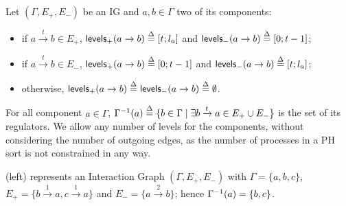\begin{definition}\label{def:levels}
Let $(\Gamma,E_+,E_-)$ be an IG and $a, b \in \Gamma$ two of its components:
\begin{itemize}
  \item if $a \xrightarrow{t} b \in E_+$, $\mathsf{levels}_+(a\rightarrow b) \stackrel{\Delta}= [t; l_a]$ and
    $\mathsf{levels}_-(a\rightarrow b) \stackrel{\Delta}= [0; t-1]$;
  \item if $a \xrightarrow{t} b \in E_-$, $\mathsf{levels}_+(a\rightarrow b) \stackrel{\Delta}= [0; t-1]$ and
    $\mathsf{levels}_-(a\rightarrow b) \stackrel{\Delta}= [t; l_a]$;
  \item otherwise, $\mathsf{levels}_+(a\rightarrow b) \stackrel{\Delta}= \mathsf{levels}_-(a\rightarrow b) \stackrel{\Delta}= \emptyset$.
\end{itemize}
\end{definition}

For all component $a \in \Gamma$, 
$\Gamma^{-1}(a) \stackrel{\Delta}= \{ b\in\Gamma\mid \exists b\xrightarrow t a\in E_+\cup E_- \}$
is the set of its regulators.
We allow any number of levels for the components, without considering the number of outgoing edges,
as the number of processes in a PH sort is not constrained in any way.

\begin{example*}
(left) represents an Interaction Graph $(\Gamma,E_+,E_-)$ with
$\Gamma = \{a, b, c\}$,
$E_+ = \{b \xrightarrow{1} a, c \xrightarrow{1} a\}$ and
$E_- = \{a \xrightarrow{2} b\}$;
hence $\Gamma^{-1}(a) = \{b, c\}$.
\end{example*}

